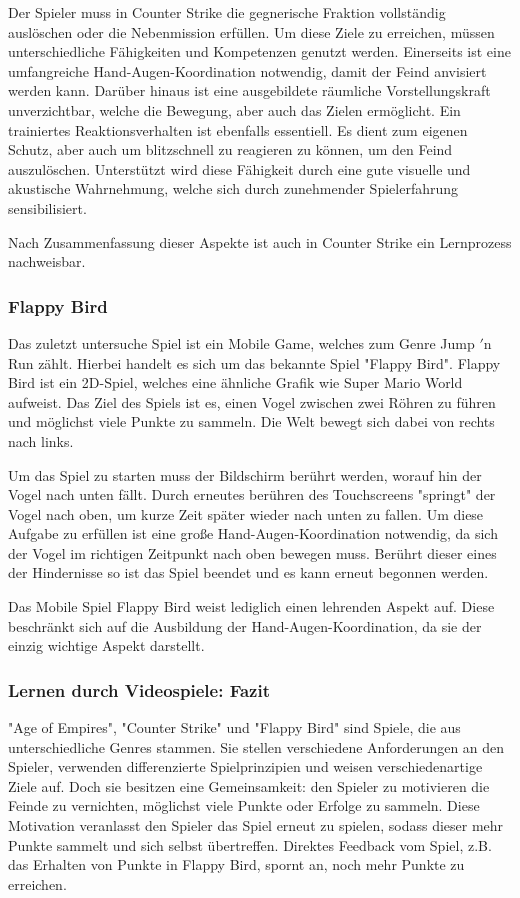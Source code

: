 Der Spieler muss in Counter Strike die gegnerische Fraktion vollständig auslöschen oder die Nebenmission erfüllen. Um diese Ziele zu erreichen, müssen unterschiedliche Fähigkeiten und Kompetenzen genutzt werden. Einerseits ist eine umfangreiche Hand-Augen-Koordination notwendig, damit der Feind anvisiert werden kann. Darüber hinaus ist eine ausgebildete räumliche Vorstellungskraft unverzichtbar, welche die Bewegung, aber auch das Zielen ermöglicht. Ein trainiertes Reaktionsverhalten ist ebenfalls essentiell. Es dient zum eigenen Schutz, aber auch um blitzschnell zu reagieren zu können, um den Feind auszulöschen. Unterstützt wird diese Fähigkeit durch eine gute visuelle und akustische Wahrnehmung, welche sich durch zunehmender Spielerfahrung sensibilisiert.

Nach Zusammenfassung dieser Aspekte ist auch in Counter Strike ein Lernprozess nachweisbar.

\subsubsection{Flappy Bird}
Das zuletzt untersuche Spiel ist ein Mobile Game, welches zum Genre Jump $'$n Run zählt. Hierbei handelt es sich um das bekannte Spiel "{}Flappy Bird"{}. Flappy Bird ist ein 2D-Spiel, welches eine ähnliche Grafik wie Super Mario World aufweist. Das Ziel des Spiels ist es, einen Vogel zwischen zwei Röhren zu führen und möglichst viele Punkte zu sammeln. Die Welt bewegt sich dabei von rechts nach links.

Um das Spiel zu starten muss der Bildschirm berührt werden, worauf hin der Vogel nach unten fällt. Durch erneutes berühren des Touchscreens "springt" der Vogel nach oben, um kurze Zeit später wieder nach unten zu fallen. Um diese Aufgabe zu erfüllen ist eine große Hand-Augen-Koordination notwendig, da sich der Vogel im richtigen Zeitpunkt nach oben bewegen muss. Berührt dieser eines der Hindernisse so ist das Spiel beendet und es kann erneut begonnen werden.

Das Mobile Spiel Flappy Bird weist lediglich einen lehrenden Aspekt auf. Diese beschränkt sich auf die Ausbildung der Hand-Augen-Koordination, da sie der einzig wichtige Aspekt darstellt.\cite{patrickbaalmann2014}

\subsubsection{Lernen durch Videospiele: Fazit}
"{}Age of Empires"{}, "{}Counter Strike"{} und "{}Flappy Bird"{} sind Spiele, die aus unterschiedliche Genres stammen. Sie stellen verschiedene Anforderungen an den Spieler, verwenden differenzierte Spielprinzipien und weisen verschiedenartige Ziele auf. Doch sie besitzen eine Gemeinsamkeit: den Spieler zu motivieren die Feinde zu vernichten, möglichst viele Punkte oder Erfolge zu sammeln. Diese Motivation veranlasst den Spieler das Spiel erneut zu spielen, sodass dieser mehr Punkte sammelt und sich selbst übertreffen. Direktes Feedback vom Spiel, z.B. das Erhalten von Punkte in Flappy Bird, spornt an, noch mehr Punkte zu erreichen. 

